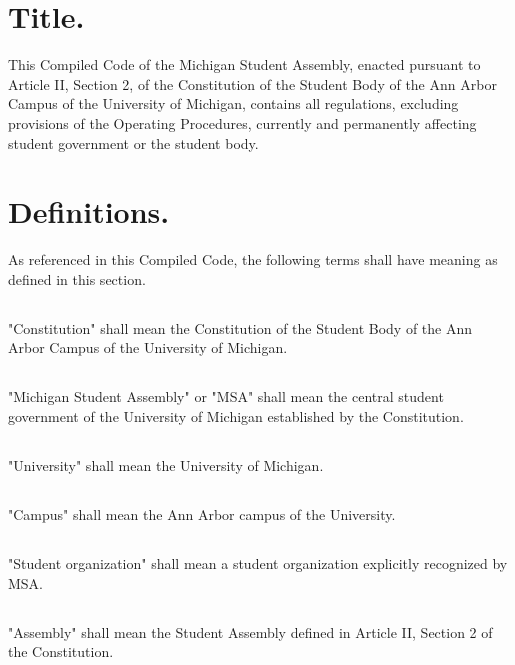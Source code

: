 
\section{Title.}
This Compiled Code of the Michigan Student Assembly, enacted pursuant to Article II, Section 2, of the Constitution of the Student Body of the Ann Arbor Campus of the University of Michigan, contains all regulations, excluding provisions of the Operating Procedures, currently and permanently affecting student government or the student body.


\section{Definitions.}
As referenced in this Compiled Code, the following terms shall have meaning as defined in this section.

\subsection{}
"Constitution" shall mean the Constitution of the Student Body of the Ann Arbor Campus of the University of Michigan.

\subsection{}
"Michigan Student Assembly" or "MSA" shall mean the central student government of the University of Michigan established by the Constitution.

\subsection{}
"University" shall mean the University of Michigan.

\subsection{}
"Campus" shall mean the Ann Arbor campus of the University.

\subsection{}
"Student organization" shall mean a student organization explicitly recognized by MSA.

\subsection{}
"Assembly" shall mean the Student Assembly defined in Article II, Section 2 of the Constitution.

